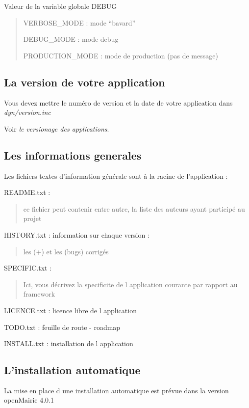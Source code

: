 \documentclass[letterpaper,10pt,french]{manual}
\begin{document}
Valeur de la variable globale DEBUG
\begin{quote}

VERBOSE\_MODE : mode ``bavard''

DEBUG\_MODE : mode debug

PRODUCTION\_MODE : mode de production (pas de message)
\end{quote}


\subsection{La version de votre application}

Vous devez mettre le numéro de version et la date  de votre application
dans \emph{dyn/version.inc}

Voir \emph{le versionage des applications}.


\subsection{Les informations generales}

Les fichiers textes d'information générale sont à la racine de l'application  :

README.txt :
\begin{quote}

ce fichier peut contenir entre autre, la liste des auteurs ayant participé au projet
\end{quote}

HISTORY.txt : information sur chaque version :
\begin{quote}

les (+) et les (bugs) corrigés
\end{quote}

SPECIFIC.txt :
\begin{quote}

Ici, vous décrivez la specificite de l application courante par rapport au framework
\end{quote}

LICENCE.txt : licence libre de l application

TODO.txt : feuille de route - roadmap

INSTALL.txt : installation de l application


\subsection{L'installation automatique}

La mise en place d une installation automatique est prévue dans la version openMairie 4.0.1
\end{document}
